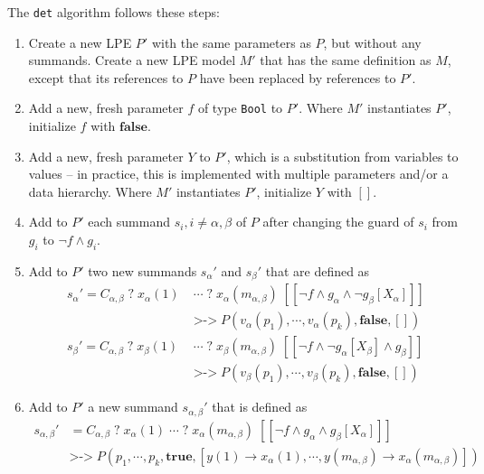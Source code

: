 The \texttt{det} algorithm follows these steps:

\begin{enumerate}
\item Create a new LPE $P'$ with the same parameters as $P$, but without any summands.
Create a new LPE model $M'$ that has the same definition as $M$, except that its references to $P$ have been replaced by references to $P'$.

\item Add a new, fresh parameter $f$ of type \texttt{Bool} to $P'$.
Where $M'$ instantiates $P'$, initialize $f$ with $\textbf{false}$.

\item Add a new, fresh parameter $Y$ to $P'$, which is a substitution from variables to values -- in practice, this is implemented with multiple parameters and/or a data hierarchy.
Where $M'$ instantiates $P'$, initialize $Y$ with $[]$.

\item Add to $P'$ each summand $s_i, i \neq \alpha, \beta$ of $P$ after changing the guard of $s_i$ from $g_i$ to $\neg f \land g_i$.

\item Add to $P'$ two new summands ${s_\alpha}'$ and ${s_\beta}'$ that are defined as
\begin{align*}
{s_\alpha}' = C_{\alpha,\beta} \; \texttt{?} \; x_\alpha(1) \; &\cdots{} \; \texttt{?} \; x_\alpha(m_{\alpha,\beta}) \; [[\neg f \land g_\alpha \land \neg g_\beta[X_\alpha]]] \\
&\texttt{>->} \; P(v_\alpha(p_1), \cdots{}, v_\alpha(p_k), \textbf{false}, []) \\
{s_\beta}' = C_{\alpha,\beta} \; \texttt{?} \; x_\beta(1) \; &\cdots{} \; \texttt{?} \; x_\beta(m_{\alpha,\beta}) \; [[\neg f \land \neg g_\alpha[X_\beta] \land g_\beta]] \\
&\texttt{>->} \; P(v_\beta(p_1), \cdots{}, v_\beta(p_k), \textbf{false}, [])
\end{align*}

\item Add to $P'$ a new summand ${s_{\alpha,\beta}}'$ that is defined as
\begin{align*}
{s_{\alpha,\beta}}' &= C_{\alpha,\beta} \; \texttt{?} \; x_\alpha(1) \; \cdots{} \; \texttt{?} \; x_\alpha(m_{\alpha,\beta}) \; [[\neg f \land g_\alpha \land g_\beta[X_\alpha]]] \\
&\texttt{>->} \; P(p_1, \cdots{}, p_k, \textbf{true}, [y(1) \rightarrow x_\alpha(1), \cdots{}, y(m_{\alpha,\beta}) \rightarrow x_\alpha(m_{\alpha,\beta})])
\end{align*}


\end{enumerate}
